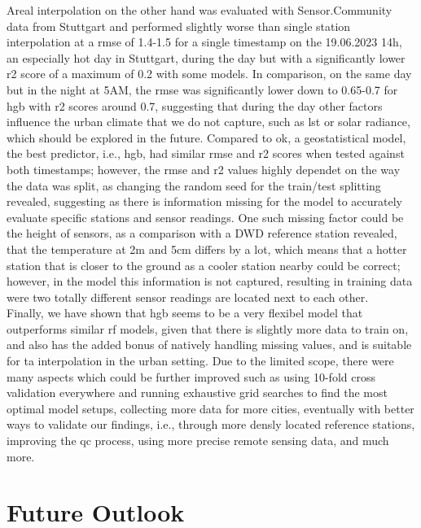 Areal interpolation on the other hand was evaluated with Sensor.Community data from Stuttgart and performed slightly worse than single station interpolation at a \gls{rmse} of 1.4-1.5 for a single timestamp on the 19.06.2023 14h, an especially hot day in Stuttgart, during the day but with a significantly lower \gls{r2} score of a maximum of 0.2 with some models. In comparison, on the same day but in the night at 5AM, the \gls{rmse} was significantly lower down to 0.65-0.7 for \gls{hgb} with \gls{r2} scores around 0.7, suggesting that during the day other factors influence the urban climate that we do not capture, such as \gls{lst} or solar radiance, which should be explored in the future. Compared to \gls{ok}, a geostatistical model, the best predictor, i.e., \gls{hgb}, had similar \gls{rmse} and \gls{r2} scores when tested against both timestamps; however, the \gls{rmse} and \gls{r2} values highly dependet on the way the data was split, as changing the random seed for the train/test splitting revealed, suggesting as there is information missing for the model to accurately evaluate specific stations and sensor readings. One such missing factor could be the height of sensors, as a comparison with a DWD reference station revealed, that the temperature at 2m and 5cm differs by a lot, which means that a hotter station that is closer to the ground as a cooler station nearby could be correct; however, in the model this information is not captured, resulting in training data were two totally different sensor readings are located next to each other.\\
Finally, we have shown that \gls{hgb} seems to be a very flexibel model that outperforms similar \gls{rf} models, given that there is slightly more data to train on, and also has the added bonus of natively handling missing values, and is suitable for \gls{ta} interpolation in the urban setting. Due to the limited scope, there were many aspects which could be further improved such as using 10-fold cross validation everywhere and running exhaustive grid searches to find the most optimal model setups, collecting more data for more cities, eventually with better ways to validate our findings, i.e., through more densly located reference stations, improving the \gls{qc} process, using more precise remote sensing data, and much more.

\section{Future Outlook}

